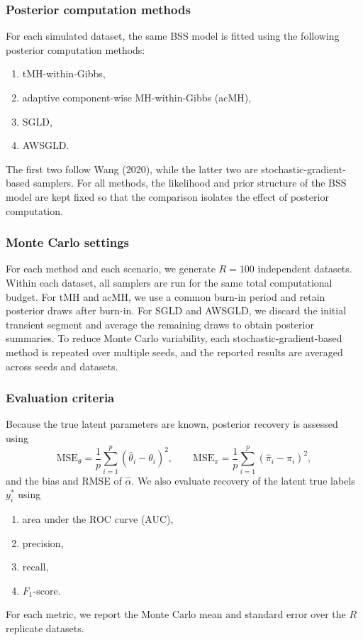 \documentclass[11pt]{article}
\begin{document}
\subsubsection{Posterior computation methods}

For each simulated dataset, the same BSS model is fitted using the following posterior computation methods:
\begin{enumerate}
    \item tMH-within-Gibbs,
    \item adaptive component-wise MH-within-Gibbs (acMH),
    \item SGLD,
    \item AWSGLD.
\end{enumerate}
The first two follow Wang (2020), while the latter two are stochastic-gradient-based samplers. For all methods, the likelihood and prior structure of the BSS model are kept fixed so that the comparison isolates the effect of posterior computation.

\subsubsection{Monte Carlo settings}

For each method and each scenario, we generate $R=100$ independent datasets. Within each dataset, all samplers are run for the same total computational budget. For tMH and acMH, we use a common burn-in period and retain posterior draws after burn-in. For SGLD and AWSGLD, we discard the initial transient segment and average the remaining draws to obtain posterior summaries. To reduce Monte Carlo variability, each stochastic-gradient-based method is repeated over multiple seeds, and the reported results are averaged across seeds and datasets.

\subsubsection{Evaluation criteria}

Because the true latent parameters are known, posterior recovery is assessed using
\[
\mathrm{MSE}_{\theta}
=
\frac{1}{p}\sum_{i=1}^p(\hat{\theta}_i-\theta_i)^2,
\qquad
\mathrm{MSE}_{\pi}
=
\frac{1}{p}\sum_{i=1}^p(\hat{\pi}_i-\pi_i)^2,
\]
and the bias and RMSE of $\hat{\alpha}$. We also evaluate recovery of the latent true labels $y_i^*$ using
\begin{enumerate}
    \item area under the ROC curve (AUC),
    \item precision,
    \item recall,
    \item $F_1$-score.
\end{enumerate}
For each metric, we report the Monte Carlo mean and standard error over the $R$ replicate datasets.
\end{document}
